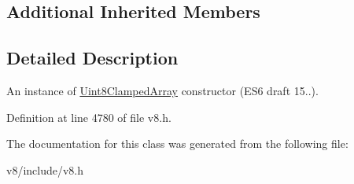 \subsection*{Additional Inherited Members}


\subsection{Detailed Description}
An instance of \mbox{\hyperlink{classv8_1_1Uint8ClampedArray}{Uint8\+Clamped\+Array}} constructor (E\+S6 draft 15..). 

Definition at line 4780 of file v8.\+h.



The documentation for this class was generated from the following file\+:\begin{DoxyCompactItemize}
\item 
v8/include/v8.\+h\end{DoxyCompactItemize}
